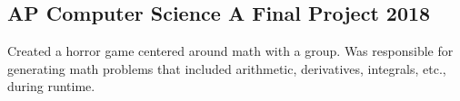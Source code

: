 \documentclass[../Resume.tex]{subfiles}
\begin{document}
	\subsection{AP Computer Science A Final Project \null\hfill 2018}
	\par Created a horror game centered around math with a group. Was responsible for generating math problems that included arithmetic, derivatives, integrals, etc., during runtime.
	\vspace*{-2mm}
\end{document}
